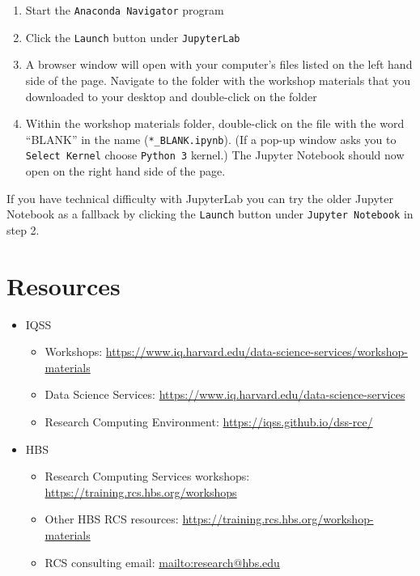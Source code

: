 \documentclass[
]{book}
\providecommand{\tightlist}{%
  \setlength{\itemsep}{0pt}\setlength{\parskip}{0pt}}
\begin{document}
\begin{enumerate}
\def\labelenumi{\arabic{enumi}.}
\tightlist
\item
  Start the \texttt{Anaconda\ Navigator} program
\item
  Click the \texttt{Launch} button under \texttt{JupyterLab}
\item
  A browser window will open with your computer's files listed on the left hand side of the page. Navigate to the folder with the workshop materials that you downloaded to your desktop and double-click on the folder
\item
  Within the workshop materials folder, double-click on the file with the word ``BLANK'' in the name (\texttt{*\_BLANK.ipynb}). (If a pop-up window asks you to \texttt{Select\ Kernel} choose \texttt{Python\ 3} kernel.) The Jupyter Notebook should now open on the right hand side of the page.
\end{enumerate}

If you have technical difficulty with JupyterLab you can try the older Jupyter Notebook as a fallback by clicking the \texttt{Launch} button under \texttt{Jupyter\ Notebook} in step 2.

\hypertarget{resources-6}{%
\section{Resources}\label{resources-6}}

\begin{itemize}
\tightlist
\item
  IQSS

  \begin{itemize}
  \tightlist
  \item
    Workshops: \url{https://www.iq.harvard.edu/data-science-services/workshop-materials}
  \item
    Data Science Services: \url{https://www.iq.harvard.edu/data-science-services}
  \item
    Research Computing Environment: \url{https://iqss.github.io/dss-rce/}
  \end{itemize}
\item
  HBS

  \begin{itemize}
  \tightlist
  \item
    Research Computing Services workshops: \url{https://training.rcs.hbs.org/workshops}
  \item
    Other HBS RCS resources: \url{https://training.rcs.hbs.org/workshop-materials}
  \item
    RCS consulting email: \url{mailto:research@hbs.edu}
  \end{itemize}
\end{itemize}
\end{document}
